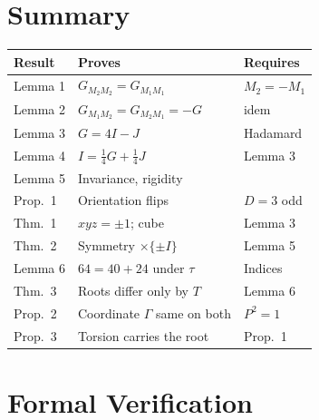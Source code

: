 \documentclass[twocolumn]{iopjournal}
\theoremstyle{definition}
\theoremstyle{remark}
\begin{document}

\section*{Summary}

\vspace{4pt}
\noindent
{\footnotesize
\begin{tabular*}{\columnwidth}{@{\extracolsep{\fill}}lll@{}}
\hline
Result & Proves & Requires \\
\hline
Lemma 1 & $G_{M_2M_2} = G_{M_1M_1}$ & $M_2 = -M_1$ \\
Lemma 2 & $G_{M_1M_2} = G_{M_2M_1} = -G$ & idem \\
Lemma 3 & $G = 4I - J$ & Hadamard \\
Lemma 4 & $I = \tfrac14G + \tfrac14J$ & Lemma 3 \\
Lemma 5 & Invariance, rigidity & \cite{NelsonForced} \\
Prop.\ 1 & Orientation flips & $D = 3$ odd \\
Thm.\ 1 & $xyz = \pm1$; cube & Lemma 3 \\
Thm.\ 2 & Symmetry $\times\{\pm I\}$ & Lemma 5 \\
Lemma 6 & $64 = 40 + 24$ under $\tau$ & Indices \\
Thm.\ 3 & Roots differ only by $T$ & Lemma 6 \\
Prop.\ 2 & Coordinate $\Gamma$ same on both & $P^2 = 1$ \\
Prop.\ 3 & Torsion carries the root & Prop.~1 \\
\hline
\end{tabular*}}
\vspace{4pt}


\section*{Formal Verification}
\end{document}
